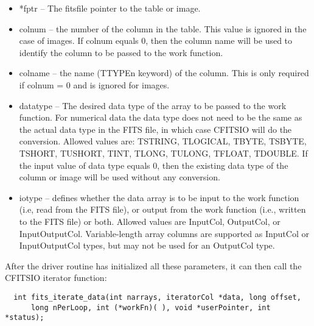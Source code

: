\documentclass[11pt]{book}
\begin{document}
\begin{itemize}
\item
  *fptr --  The fitsfile pointer to the table or image.
\item
colnum -- the number of the column in the table.  This value is ignored
          in the case of images.  If colnum equals 0, then the column name
          will be used to identify the column to be passed to the
          work function.

\item
colname -- the name (TTYPEn keyword) of the column.  This is
           only required if colnum = 0 and is ignored for images.
\item
datatype -- The desired data type of the array to be passed to the
            work function.  For numerical data the data type does
            not need to be the same as the actual data type in the
            FITS file, in which case CFITSIO will do the conversion.
            Allowed values are: TSTRING, TLOGICAL, TBYTE, TSBYTE, TSHORT, TUSHORT,
            TINT, TLONG, TULONG, TFLOAT, TDOUBLE.  If the input
            value of data type equals 0, then the  existing
            data type of the column or image will be used without
            any conversion.

\item
iotype -- defines whether the data array is to be input to the
          work function (i.e, read from the FITS file), or output
          from the work function (i.e., written to the FITS file) or
          both.  Allowed values are InputCol, OutputCol, or InputOutputCol.
	  Variable-length array columns are supported as InputCol or
	  InputOutputCol types, but may not be used for an OutputCol type.
\end{itemize}

After the driver routine has initialized all these parameters, it
can then call the CFITSIO iterator function:


\begin{verbatim}
  int fits_iterate_data(int narrays, iteratorCol *data, long offset,
      long nPerLoop, int (*workFn)( ), void *userPointer, int *status);
\end{verbatim}
\end{document}
